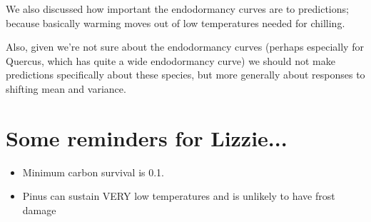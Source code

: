 \documentclass[11pt,letter]{article}
\begin{document}
We also discussed how important the endodormancy curves are to predictions; because basically warming moves out of low temperatures needed for chilling.

Also, given we're not sure about the endodormancy curves (perhaps especially for Quercus, which has quite a wide endodormancy curve) we should not make predictions specifically about these species, but more generally about responses to shifting mean and variance. 

\newpage
\section{Some reminders for Lizzie... }
\begin{itemize}
\item Minimum carbon survival is 0.1. 
\item Pinus can sustain VERY low temperatures and is unlikely to have frost damage
\end{itemize}
\end{document}
